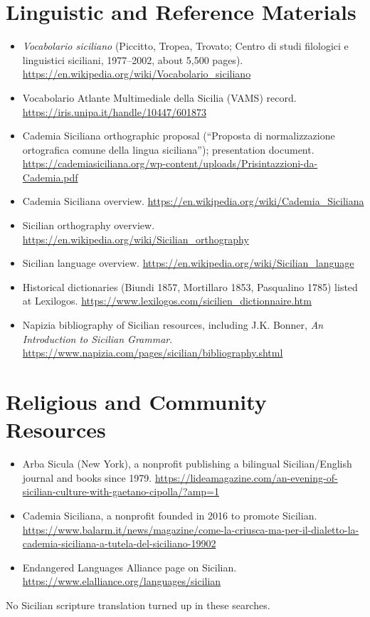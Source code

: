 \documentclass[12pt]{article}
\begin{document}
\section{Linguistic and Reference Materials}
\begin{itemize}
\item \emph{Vocabolario siciliano} (Piccitto, Tropea, Trovato; Centro di studi filologici e linguistici siciliani, 1977--2002, about 5,500 pages). \url{https://en.wikipedia.org/wiki/Vocabolario_siciliano}
\item Vocabolario Atlante Multimediale della Sicilia (VAMS) record. \url{https://iris.unipa.it/handle/10447/601873}
\item Cademia Siciliana orthographic proposal (``Proposta di normalizzazione ortografica comune della lingua siciliana''); presentation document. \url{https://cademiasiciliana.org/wp-content/uploads/Prisintazzioni-da-Cademia.pdf}
\item Cademia Siciliana overview. \url{https://en.wikipedia.org/wiki/Cademia_Siciliana}
\item Sicilian orthography overview. \url{https://en.wikipedia.org/wiki/Sicilian_orthography}
\item Sicilian language overview. \url{https://en.wikipedia.org/wiki/Sicilian_language}
\item Historical dictionaries (Biundi 1857, Mortillaro 1853, Pasqualino 1785) listed at Lexilogos. \url{https://www.lexilogos.com/sicilien_dictionnaire.htm}
\item Napizia bibliography of Sicilian resources, including J.K. Bonner, \emph{An Introduction to Sicilian Grammar}. \url{https://www.napizia.com/pages/sicilian/bibliography.shtml}
\end{itemize}

\section{Religious and Community Resources}
\begin{itemize}
\item Arba Sicula (New York), a nonprofit publishing a bilingual Sicilian/English journal and books since 1979. \url{https://lideamagazine.com/an-evening-of-sicilian-culture-with-gaetano-cipolla/?amp=1}
\item Cademia Siciliana, a nonprofit founded in 2016 to promote Sicilian. \url{https://www.balarm.it/news/magazine/come-la-criusca-ma-per-il-dialetto-la-cademia-siciliana-a-tutela-del-siciliano-19902}
\item Endangered Languages Alliance page on Sicilian. \url{https://www.elalliance.org/languages/sicilian}
\end{itemize}
No Sicilian scripture translation turned up in these searches.
\end{document}
